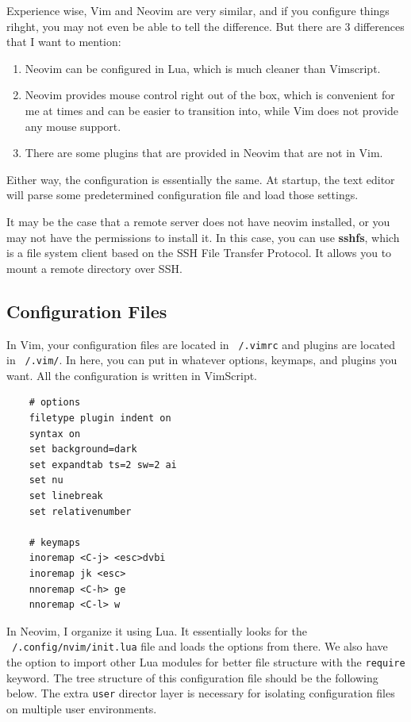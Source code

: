   \begin{example}
    \label{ex:vim-vs-neovim}
    Experience wise, Vim and Neovim are very similar, and if you configure things rihght, you may not even be able to tell the difference. But there are 3 differences that I want to mention: 
    \begin{enumerate}
      \item Neovim can be configured in Lua, which is much cleaner than Vimscript. 
      \item Neovim provides mouse control right out of the box, which is convenient for me at times and can be easier to transition into, while Vim does not provide any mouse support. 
      \item There are some plugins that are provided in Neovim that are not in Vim. 
    \end{enumerate}
    Either way, the configuration is essentially the same. At startup, the text editor will parse some predetermined configuration file and load those settings. 
  \end{example}

  It may be the case that a remote server does not have neovim installed, or you may not have the permissions to install it. In this case, you can use \textbf{sshfs}, which is a file system client based on the SSH File Transfer Protocol. It allows you to mount a remote directory over SSH. 

\subsection{Configuration Files}

  In Vim, your configuration files are located in \texttt{~/.vimrc} and plugins are located in \texttt{~/.vim/}. In here, you can put in whatever options, keymaps, and plugins you want. All the configuration is written in VimScript. 

  \begin{lstlisting} 
    # options 
    filetype plugin indent on 
    syntax on 
    set background=dark
    set expandtab ts=2 sw=2 ai
    set nu
    set linebreak 
    set relativenumber        
    
    # keymaps
    inoremap <C-j> <esc>dvbi
    inoremap jk <esc>
    nnoremap <C-h> ge
    nnoremap <C-l> w 
  \end{lstlisting}

  In Neovim, I organize it using Lua. It essentially looks for the \texttt{~/.config/nvim/init.lua} file and loads the options from there. We also have the option to import other Lua modules for better file structure with the \texttt{require} keyword. The tree structure of this configuration file should be the following below. The extra \texttt{user} director layer is necessary for isolating configuration files on multiple user environments.  
  
